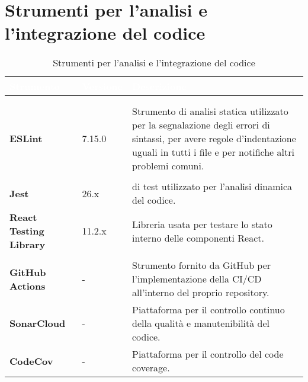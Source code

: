 \section{Strumenti per l'analisi e l'integrazione del codice}

{
\setlength\arrayrulewidth{0.95pt}
\renewcommand{\arraystretch}{1.5}
\begin{longtable}{C{3cm} | C{2cm} | C{10cm}}

\textcolor{white}{\textbf{Strumento}}&
\textcolor{white}{\textbf{Versione}}&
\textcolor{white}{\textbf{Descrizione}} \\
\endfirsthead
{}\\
\endfoot
{}\caption{Strumenti per l'analisi e l'integrazione del codice}
\endlastfoot
	
 \\

\textbf{ESLint} & 7.15.0 & 
	Strumento di analisi statica utilizzato per la segnalazione degli errori di sintassi, per avere regole  d'indentazione uguali in tutti i file e per notifiche altri problemi comuni. \\

 \\

\textbf{Jest} & 26.x & 
 di test utilizzato per l'analisi dinamica del codice. \\

\textbf{React Testing Library} & 11.2.x & 
Libreria usata per testare lo stato interno delle componenti React. \\

 \\

\textbf{GitHub Actions} & - & 
Strumento fornito da GitHub per l'implementazione della CI/CD all'interno del proprio repository. \\

\textbf{SonarCloud} & - & 
Piattaforma per il controllo continuo della qualità e manutenibilità del codice.\\

\textbf{CodeCov} & - & 
Piattaforma per il controllo del code coverage.\\

\end{longtable}
}